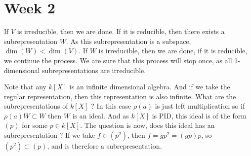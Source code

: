 \section*{Week 2}

If $V$ is irreducible, then we are done. If it is reducible, then there exists a subrepresentation $W$. As this subrepresentation is a subspace, $\dim(W) < \dim (V)$. If $W$ is irreducible, then we are done, if it is reducible, we continue the process. We are sure that this process will stop once, as all 1-dimensional subrepresentations are irreducible.

Note that any $k[X]$ is an infinite dimensional algebra. And if we take the regular representation, then this representation is also infinite. What are the subrepresentations of $k[X]$ ? In this case $\rho(a)$ is just left multiplication so if $\rho(a)W \subset W$ then $W$ is an ideal. And as $k[X]$ is PID, this ideal is of the form $(p)$ for some $p \in k[X]$. The question is now, does this ideal has an subrepresentation ? If we take $f \in (p^2)$, then $f= gp^2= (gp)p$, so $(p^2)\subset (p)$, and is therefore a subrepresentation. 